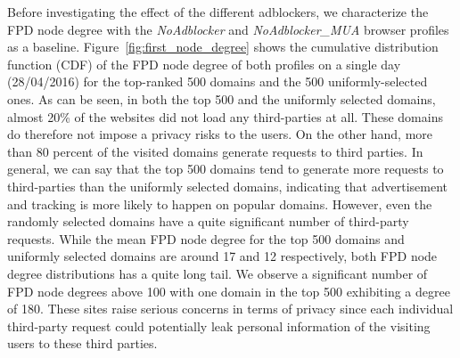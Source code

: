 \documentclass[compsoc, conference, letterpaper, 10pt, times]{IEEEtran}
\begin{document}

Before investigating the effect of the different adblockers, we characterize the FPD node degree with the \textit{NoAdblocker} and \textit{NoAdblocker\_MUA} browser profiles as a baseline. Figure~\ref{fig:first_node_degree} shows the cumulative distribution function (CDF) of the FPD node degree of both profiles on a single day (28/04/2016) for the top-ranked 500 domains and the 500 uniformly-selected ones. As can be seen, in both the top 500 and the uniformly selected domains, almost 20\% of the websites did not load any third-parties at all. These domains do therefore not impose a privacy risks to the users. On the other hand, more than 80 percent of the visited domains generate requests to third parties. In general, we can say that the top 500 domains tend to generate more requests to third-parties than the uniformly selected domains, indicating that advertisement and tracking is more likely to happen on popular domains. However, even the randomly selected domains have a quite significant number of third-party requests. While the mean FPD node degree for the top 500 domains and uniformly selected domains are around 17 and 12 respectively, both FPD node degree distributions has a quite long tail. We observe a significant number of FPD node degrees above 100 with one domain in the top 500 exhibiting a degree of 180. These sites raise serious concerns in terms of privacy since each individual third-party request could potentially leak personal information of the visiting users to these third parties.

\end{document}

